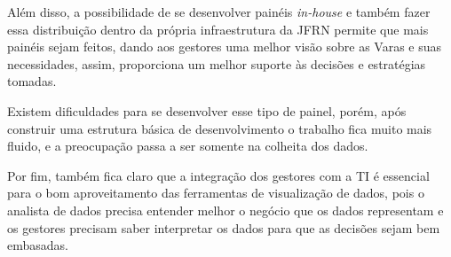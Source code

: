 Além disso, a possibilidade de se desenvolver painéis \textit{in-house} e também fazer essa distribuição dentro da própria infraestrutura da JFRN permite que mais painéis sejam feitos, dando aos gestores uma melhor visão sobre as Varas e suas necessidades, assim, proporciona um melhor suporte às decisões e estratégias tomadas. 

Existem dificuldades para se desenvolver esse tipo de painel, porém, após construir uma estrutura básica de desenvolvimento o trabalho fica muito mais fluido, e a preocupação passa a ser somente na colheita dos dados. 

Por fim, também fica claro que a integração dos gestores com a TI é essencial para o bom aproveitamento das ferramentas de visualização de dados, pois o analista de dados precisa entender melhor o negócio que os dados representam e os gestores precisam saber interpretar os dados para que as decisões sejam bem embasadas.